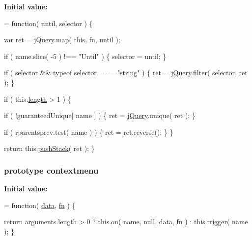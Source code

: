 {\bfseries Initial value\-:}
\begin{DoxyCode}
= \textcolor{keyword}{function}( until, selector ) \{


        var ret = \hyperlink{jquery-1_810_82-vsdoc_8js_add5237586d970a38a81f990e8eb28c6c}{jQuery}.map( \textcolor{keyword}{this}, \hyperlink{jquery-1_810_82-vsdoc_8js_acef6bdaf6b9b20fdcca1ea86f0902c3b}{fn}, until );

        \textcolor{keywordflow}{if} ( name.slice( -5 ) !== \textcolor{stringliteral}{"Until"} ) \{
            selector = until;
        \}

        \textcolor{keywordflow}{if} ( selector && typeof selector === \textcolor{stringliteral}{"string"} ) \{
            ret = \hyperlink{jquery-1_810_82-vsdoc_8js_add5237586d970a38a81f990e8eb28c6c}{jQuery}.filter( selector, ret );
        \}

        \textcolor{keywordflow}{if} ( this.\hyperlink{jquery-1_810_82-vsdoc_8js_aa7de35d58da66d9944ab9cbe82c19640}{length} > 1 ) \{
            
            \textcolor{keywordflow}{if} ( !guaranteedUnique[ name ] ) \{
                ret = \hyperlink{jquery-1_810_82-vsdoc_8js_add5237586d970a38a81f990e8eb28c6c}{jQuery}.unique( ret );
            \}

            
            \textcolor{keywordflow}{if} ( rparentsprev.test( name ) ) \{
                ret = ret.reverse();
            \}
        \}

        \textcolor{keywordflow}{return} this.\hyperlink{jquery-1_810_82-vsdoc_8js_afc3a7db1ef2b526338c06c07cecccd44}{pushStack}( ret );
    \}
\end{DoxyCode}
\hypertarget{jquery-1_810_82-vsdoc_8js_afb948baf7821b3f288133d6f9b8da16d}{
\subsubsection[{contextmenu}]{ {\bf prototype} contextmenu}}\label{jquery-1_810_82-vsdoc_8js_afb948baf7821b3f288133d6f9b8da16d}
{\bfseries Initial value\-:}
\begin{DoxyCode}
= \textcolor{keyword}{function}( \hyperlink{jquery-1_810_82-vsdoc_8js_a609407b3456fdc3c5671a9fc4a226ff7}{data}, \hyperlink{jquery-1_810_82-vsdoc_8js_acef6bdaf6b9b20fdcca1ea86f0902c3b}{fn} ) \{

        \textcolor{keywordflow}{return} arguments.length > 0 ?
            this.\hyperlink{jquery-1_810_82-vsdoc_8js_ae453b412b883f60220d73468ef6c6dbc}{on}( name, null, \hyperlink{jquery-1_810_82-vsdoc_8js_a609407b3456fdc3c5671a9fc4a226ff7}{data}, \hyperlink{jquery-1_810_82-vsdoc_8js_acef6bdaf6b9b20fdcca1ea86f0902c3b}{fn} ) :
            this.\hyperlink{jquery-1_810_82-vsdoc_8js_a2388c4114d5e3e4eab020f973641519c}{trigger}( name );
    \}
\end{DoxyCode}
